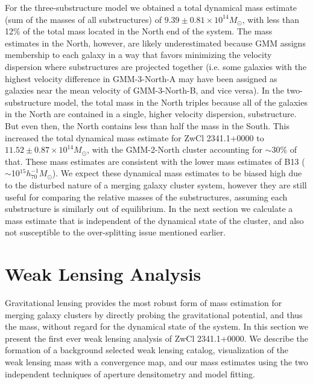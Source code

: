 \documentclass[onecolumn]{aastex}
\begin{document}
For the three-substructure model we obtained a total dynamical mass estimate (sum of the masses of all substructures) of $9.39 \pm 0.81 \times 10^{14} M_\odot$, with less than 12$\%$ of the total mass located in the North end of the system.  The mass estimates in the North, however, are likely underestimated because GMM assigns membership to each galaxy in a way that favors minimizing the velocity dispersion where substructures are projected together (i.e. some galaxies with the highest velocity difference in GMM-3-North-A may have been assigned as galaxies near the mean velocity of GMM-3-North-B, and vice versa).  In the two-substructure model, the total mass in the North triples because all of the galaxies in the North are contained in a single, higher velocity dispersion, substructure.  But even then, the North contains less than half the mass in the South.  This increased the total dynamical mass estimate for ZwCl 2341.1+0000 to $11.52 \pm 0.87 \times 10^{14} M_\odot$, with the GMM-2-North cluster accounting for $\sim30\%$ of that.  These mass estimates are consistent with the lower mass estimates of B13 ($\sim$10$^{15} h^{-1}_{70} M_\odot$).  We expect these dynamical mass estimates to be biased high due to the disturbed nature of a merging galaxy cluster system, however they are still useful for comparing the relative masses of the substructures, assuming each substructure is similarly out of equilibrium.  In the next section we calculate a mass estimate that is independent of the dynamical state of the cluster, and also not susceptible to the over-splitting issue mentioned earlier.

\section[]{Weak Lensing Analysis}
Gravitational lensing provides the most robust form of mass estimation for merging galaxy clusters by directly probing the gravitational potential, and thus the mass, without regard for the dynamical state of the system.  In this section we present the first ever weak lensing analysis of ZwCl 2341.1+0000.  We describe the formation of a background selected weak lensing catalog, visualization of the weak lensing mass with a convergence map, and our mass estimates using the two independent techniques of aperture densitometry and model fitting.
\end{document}
